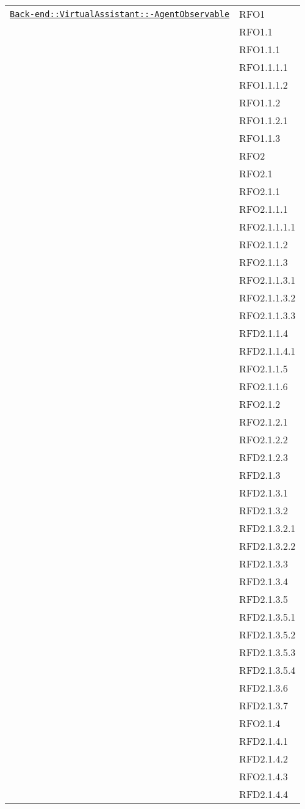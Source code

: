 \begin{longtable}{|>{\centering}m{10cm}|m{3cm}<{\centering}|}
\hyperref[Back-end::VirtualAssistant::AgentObservable]{\texttt{Back-end::VirtualAssistant::-\linebreak AgentObservable}} & RFO1\\
& RFO1.1\\
& RFO1.1.1\\
& RFO1.1.1.1\\
& RFO1.1.1.2\\
& RFO1.1.2\\
& RFO1.1.2.1\\
& RFO1.1.3\\
& RFO2\\
& RFO2.1\\
& RFO2.1.1\\
& RFO2.1.1.1\\
& RFO2.1.1.1.1\\
& RFO2.1.1.2\\
& RFO2.1.1.3\\
& RFO2.1.1.3.1\\
& RFO2.1.1.3.2\\
& RFO2.1.1.3.3\\
& RFD2.1.1.4\\
& RFD2.1.1.4.1\\
& RFO2.1.1.5\\
& RFO2.1.1.6\\
& RFO2.1.2\\
& RFO2.1.2.1\\
& RFO2.1.2.2\\
& RFD2.1.2.3\\
& RFD2.1.3\\
& RFD2.1.3.1\\
& RFD2.1.3.2\\
& RFD2.1.3.2.1\\
& RFD2.1.3.2.2\\
& RFD2.1.3.3\\
& RFD2.1.3.4\\
& RFD2.1.3.5\\
& RFD2.1.3.5.1\\
& RFD2.1.3.5.2\\
& RFD2.1.3.5.3\\
& RFD2.1.3.5.4\\
& RFD2.1.3.6\\
& RFD2.1.3.7\\
& RFO2.1.4\\
& RFD2.1.4.1\\
& RFD2.1.4.2\\
& RFO2.1.4.3\\
& RFD2.1.4.4\\

\end{longtable}
